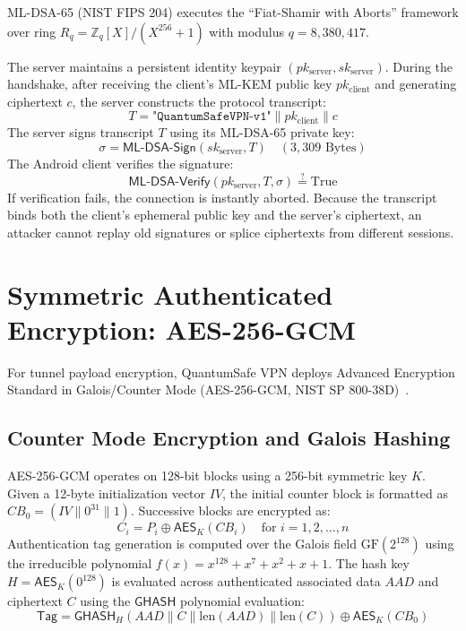 ML-DSA-65 (NIST FIPS 204) executes the ``Fiat-Shamir with Aborts'' framework over ring $R_q = \mathbb{Z}_q[X]/(X^{256} + 1)$ with modulus $q = 8,380,417$.

The server maintains a persistent identity keypair $(pk_{\text{server}}, sk_{\text{server}})$. During the handshake, after receiving the client's ML-KEM public key $pk_{\text{client}}$ and generating ciphertext $c$, the server constructs the protocol transcript:
\begin{equation}
T = \texttt{"QuantumSafeVPN-v1"} \parallel pk_{\text{client}} \parallel c
\end{equation}
The server signs transcript $T$ using its ML-DSA-65 private key:
\begin{equation}
\sigma = \mathsf{ML}\text{-}\mathsf{DSA}\text{-}\mathsf{Sign}(sk_{\text{server}}, T) \quad (3,309\text{ Bytes})
\end{equation}
The Android client verifies the signature:
\begin{equation}
\mathsf{ML}\text{-}\mathsf{DSA}\text{-}\mathsf{Verify}(pk_{\text{server}}, T, \sigma) \stackrel{?}{=} \text{True}
\end{equation}
If verification fails, the connection is instantly aborted. Because the transcript binds both the client's ephemeral public key and the server's ciphertext, an attacker cannot replay old signatures or splice ciphertexts from different sessions.

\section{Symmetric Authenticated Encryption: AES-256-GCM}
\label{sec:aes_gcm_mechanics}

For tunnel payload encryption, QuantumSafe VPN deploys Advanced Encryption Standard in Galois/Counter Mode (AES-256-GCM, NIST SP 800-38D)~\cite{nist_sp_800_38d,nist_fips_197}.

\subsection{Counter Mode Encryption and Galois Hashing}
AES-256-GCM operates on 128-bit blocks using a 256-bit symmetric key $K$. Given a 12-byte initialization vector $IV$, the initial counter block is formatted as $CB_0 = (IV \parallel 0^{31} \parallel 1)$. Successive blocks are encrypted as:
\begin{equation}
C_i = P_i \oplus \mathsf{AES}_K(CB_i) \quad \text{for } i = 1, 2, \dots, n
\end{equation}
Authentication tag generation is computed over the Galois field $\text{GF}(2^{128})$ using the irreducible polynomial $f(x) = x^{128} + x^7 + x^2 + x + 1$. The hash key $H = \mathsf{AES}_K(0^{128})$ is evaluated across authenticated associated data $AAD$ and ciphertext $C$ using the $\mathsf{GHASH}$ polynomial evaluation:
\begin{equation}
\mathsf{Tag} = \mathsf{GHASH}_H(AAD \parallel C \parallel \text{len}(AAD) \parallel \text{len}(C)) \oplus \mathsf{AES}_K(CB_0)
\end{equation}

